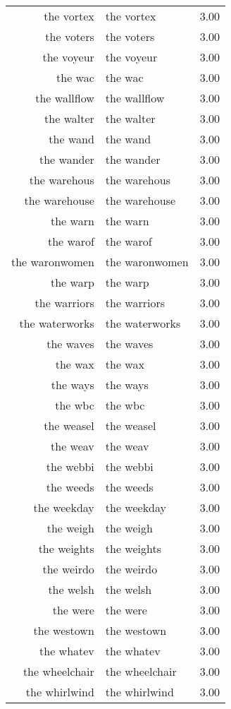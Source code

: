 \begin{table}[ht]
\begin{tabular}{rlr}
  the vortex & the vortex & 3.00 \\ 
  the voters & the voters & 3.00 \\ 
  the voyeur & the voyeur & 3.00 \\ 
  the wac & the wac & 3.00 \\ 
  the wallflow & the wallflow & 3.00 \\ 
  the walter & the walter & 3.00 \\ 
  the wand & the wand & 3.00 \\ 
  the wander & the wander & 3.00 \\ 
  the warehous & the warehous & 3.00 \\ 
  the warehouse & the warehouse & 3.00 \\ 
  the warn & the warn & 3.00 \\ 
  the warof & the warof & 3.00 \\ 
  the waronwomen & the waronwomen & 3.00 \\ 
  the warp & the warp & 3.00 \\ 
  the warriors & the warriors & 3.00 \\ 
  the waterworks & the waterworks & 3.00 \\ 
  the waves & the waves & 3.00 \\ 
  the wax & the wax & 3.00 \\ 
  the ways & the ways & 3.00 \\ 
  the wbc & the wbc & 3.00 \\ 
  the weasel & the weasel & 3.00 \\ 
  the weav & the weav & 3.00 \\ 
  the webbi & the webbi & 3.00 \\ 
  the weeds & the weeds & 3.00 \\ 
  the weekday & the weekday & 3.00 \\ 
  the weigh & the weigh & 3.00 \\ 
  the weights & the weights & 3.00 \\ 
  the weirdo & the weirdo & 3.00 \\ 
  the welsh & the welsh & 3.00 \\ 
  the were & the were & 3.00 \\ 
  the westown & the westown & 3.00 \\ 
  the whatev & the whatev & 3.00 \\ 
  the wheelchair & the wheelchair & 3.00 \\ 
  the whirlwind & the whirlwind & 3.00 \\ 

\end{tabular}
\end{table}
